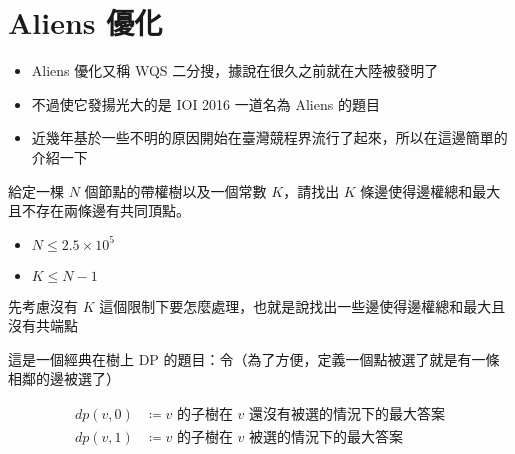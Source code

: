 \documentclass[standalone]{beamer}
\begin{document}
\section{Aliens 優化}

\begin{frame}{}
  \begin{itemize}
    \item Aliens 優化又稱 WQS 二分搜，據說在很久之前就在大陸被發明了
    \item 不過使它發揚光大的是 IOI 2016 一道名為 Aliens 的題目
    \item 近幾年基於一些不明的原因開始在臺灣競程界流行了起來，所以在這邊簡單的介紹一下
  \end{itemize}
\end{frame}

\begin{frame}{}
  \begin{problem}
    給定一棵 $N$ 個節點的帶權樹以及一個常數 $K$，請找出 $K$ 條邊使得邊權總和最大且不存在兩條邊有共同頂點。

    \begin{itemize}
      \item $N \leq 2.5 \times 10^5$
      \item $K \leq N - 1$
    \end{itemize}
  \end{problem}
\end{frame}

\begin{frame}{}
  先考慮沒有 $K$ 這個限制下要怎麼處理，也就是說找出一些邊使得邊權總和最大且沒有共端點
  
  這是一個經典在樹上 DP 的題目：令（為了方便，定義一個點被選了就是有一條相鄰的邊被選了）

  \begin{align*}
    dp(v, 0) &\coloneqq \text{$v$ 的子樹在 $v$ 還沒有被選的情況下的最大答案} \\
    dp(v, 1) &\coloneqq \text{$v$ 的子樹在 $v$ 被選的情況下的最大答案} \\
  \end{align*} 
\end{frame}
\end{document}
